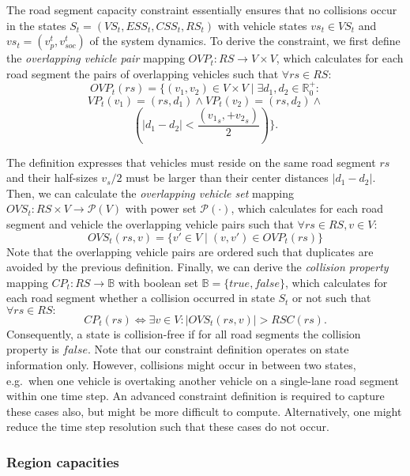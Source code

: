 The road segment capacity constraint essentially ensures that no collisions occur in the states $S_t = (VS_t, ESS_t, CSS_t, RS_t)$ with vehicle states $vs_t \in VS_t$ and $vs_t = (v_p^t, v_{soc}^t)$ of the system dynamics. To derive the constraint, we first define the \textit{overlapping vehicle pair} mapping $OVP_t : RS \rightarrow V \times V$, which calculates for each road segment the pairs of overlapping vehicles such that $\forall rs \in RS:$
\[
	OVP_t(rs) = \{(v_1, v_2) \in V \times V \mid \exists d_1, d_2 \in \mathbb{R}_0^+:
\]
\[
	VP_t(v_1) = (rs, d_1) \wedge VP_t(v_2) = (rs, d_2) \wedge
\]
\[
(|d_1 - d_2| < \frac{({v_1}_s,+{v_2}_s)}{2} ) \} \textrm{.}	
\]


The definition expresses that vehicles must reside on the same road segment $rs$ and their half-sizes $v_s / 2$ must be larger than their center distances $|d_1 - d_2|$. Then, we can calculate the \textit{overlapping vehicle set} mapping $OVS_t : RS \times V \rightarrow \mathcal{P}(V)$ with power set $\mathcal{P}(\cdot)$, which calculates for each road segment and vehicle the overlapping vehicle pairs such that $\forall rs \in RS, v \in V:$
\[
	OVS_t(rs,v) = \{v' \in V \mid (v, v') \in OVP_t(rs)\}
\]
Note that the overlapping vehicle pairs are ordered such that duplicates are avoided by the previous definition. Finally, we can derive the \textit{collision property} mapping $CP_t : RS \rightarrow \mathbb{B}$ with boolean set $\mathbb{B} = \{true, false\}$, which calculates for each road segment whether a collision occurred in state $S_t$ or not such that $\forall rs \in RS:$
\[
	CP_t(rs) \Leftrightarrow \exists v \in V : |OVS_t(rs, v)| > RSC(rs) \textrm{.}
\]
Consequently, a state is collision-free if for all road segments the collision property is $false$. Note that our constraint definition operates on state information only. However, collisions might occur in between two states, e.g.\ when one vehicle is overtaking another vehicle on a single-lane road segment within one time step. An advanced constraint definition is required to capture these cases also, but might be more difficult to compute. Alternatively, one might reduce the time step resolution such that these cases do not occur.

\subsubsection{Region capacities}
\label{capacities}

